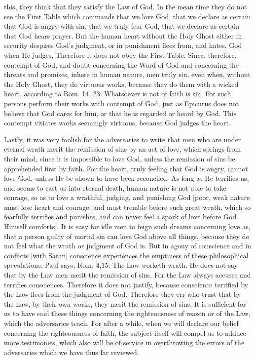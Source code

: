 this, they think that they satisfy the Law of God.  In the mean time
they do not see the First Table which commands that we love God, that
we declare as certain that God is angry with sin, that we truly fear
God, that we declare as certain that God hears prayer.  But the human
heart without the Holy Ghost either in security despises God's
judgment, or in punishment flees from, and hates, God when He judges.
Therefore it does not obey the First Table.  Since, therefore,
contempt of God, and doubt concerning the Word of God and concerning
the threats and promises, inhere in human nature, men truly sin, even
when, without the Holy Ghost, they do virtuous works, because they do
them with a wicked heart, according to Rom. 14, 23: Whatsoever is not
of faith is sin.  For such persons perform their works with contempt
of God, just as Epicurus does not believe that God cares for him, or
that he is regarded or heard by God.  This contempt vitiates works
seemingly virtuous, because God judges the heart.

Lastly, it was very foolish for the adversaries to write that men who
are under eternal wrath merit the remission of sins by an act of love,
which springs from their mind, since it is impossible to love God,
unless the remission of sins be apprehended first by faith.  For the
heart, truly feeling that God is angry, cannot love God, unless He be
shown to have been reconciled.  As long as He terrifies us, and seems
to cast us into eternal death, human nature is not able to take
courage, so as to love a wrathful, judging, and punishing God [poor,
weak nature must lose heart and courage, and must tremble before such
great wrath, which so fearfully terrifies and punishes, and can never
feel a spark of love before God Himself comforts].  It is easy for
idle men to feign such dreams concerning love as, that a person
guilty of mortal sin can love God above all things, because they do
not feel what the wrath or judgment of God is.  But in agony of
conscience and in conflicts [with Satan] conscience experiences the
emptiness of these philosophical speculations.  Paul says, Rom. 4,15:
The Law worketh wrath.  He does not say that by the Law men merit the
remission of sins.  For the Law always accuses and terrifies
consciences.  Therefore it does not justify, because conscience
terrified by the Law flees from the judgment of God.  Therefore they
err who trust that by the Law, by their own works, they merit the
remission of sins.  It is sufficient for us to have said these things
concerning the righteousness of reason or of the Law, which the
adversaries teach.  For after a while, when we will declare our
belief concerning the righteousness of faith, the subject itself will
compel us to adduce more testimonies, which also will be of service
in overthrowing the errors of the adversaries which we have thus far
reviewed.

